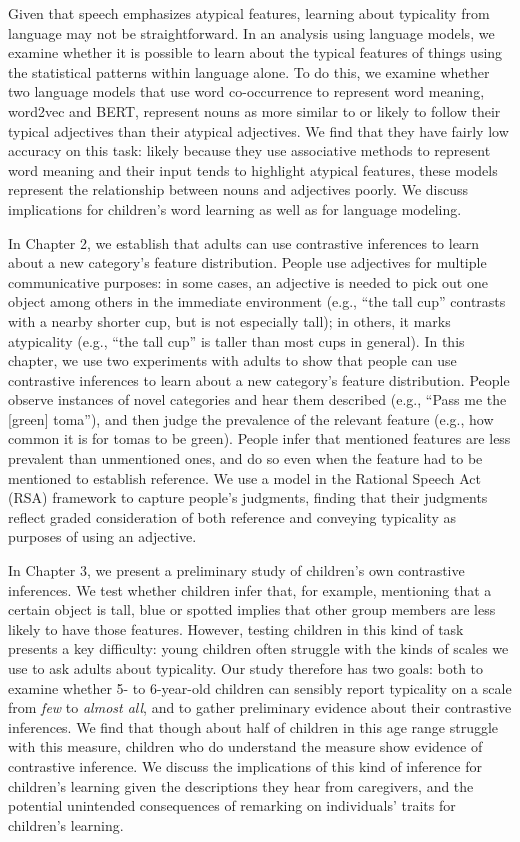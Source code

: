 \documentclass{ucetd}
\begin{document}
Given that speech emphasizes atypical features, learning about
typicality from language may not be straightforward. In an analysis
using language models, we examine whether it is possible to learn about
the typical features of things using the statistical patterns within
language alone. To do this, we examine whether two language models that
use word co-occurrence to represent word meaning, word2vec and BERT,
represent nouns as more similar to or likely to follow their typical
adjectives than their atypical adjectives. We find that they have fairly
low accuracy on this task: likely because they use associative methods
to represent word meaning and their input tends to highlight atypical
features, these models represent the relationship between nouns and
adjectives poorly. We discuss implications for children's word learning
as well as for language modeling.

In Chapter 2, we establish that adults can use contrastive inferences to
learn about a new category's feature distribution. People use adjectives
for multiple communicative purposes: in some cases, an adjective is
needed to pick out one object among others in the immediate environment
(e.g., ``the tall cup'' contrasts with a nearby shorter cup, but is not
especially tall); in others, it marks atypicality (e.g., ``the tall
cup'' is taller than most cups in general). In this chapter, we use two
experiments with adults to show that people can use contrastive
inferences to learn about a new category's feature distribution. People
observe instances of novel categories and hear them described (e.g.,
``Pass me the {[}green{]} toma''), and then judge the prevalence of the
relevant feature (e.g., how common it is for tomas to be green). People
infer that mentioned features are less prevalent than unmentioned ones,
and do so even when the feature had to be mentioned to establish
reference. We use a model in the Rational Speech Act (RSA) framework to
capture people's judgments, finding that their judgments reflect graded
consideration of both reference and conveying typicality as purposes of
using an adjective.

In Chapter 3, we present a preliminary study of children's own
contrastive inferences. We test whether children infer that, for
example, mentioning that a certain object is tall, blue or spotted
implies that other group members are less likely to have those features.
However, testing children in this kind of task presents a key
difficulty: young children often struggle with the kinds of scales we
use to ask adults about typicality. Our study therefore has two goals:
both to examine whether 5- to 6-year-old children can sensibly report
typicality on a scale from \emph{few} to \emph{almost all}, and to
gather preliminary evidence about their contrastive inferences. We find
that though about half of children in this age range struggle with this
measure, children who do understand the measure show evidence of
contrastive inference. We discuss the implications of this kind of
inference for children's learning given the descriptions they hear from
caregivers, and the potential unintended consequences of remarking on
individuals' traits for children's learning.
\end{document}
